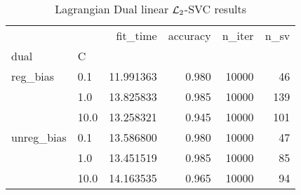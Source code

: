 \begin{table}[H]
\centering
\caption{Lagrangian Dual linear $\protect \mathcal{L}_2$-SVC results}
\label{linear_lagrangian_dual_l2_svc_cv_results}
\begin{tabular}{llrrrr}
\toprule
           &      &   fit\_time &  accuracy &  n\_iter &  n\_sv \\
dual & C &            &           &         &       \\
\midrule
reg\_bias & 0.1  &  11.991363 &     0.980 &   10000 &    46 \\
           & 1.0  &  13.825833 &     0.985 &   10000 &   139 \\
           & 10.0 &  13.258321 &     0.945 &   10000 &   101 \\
unreg\_bias & 0.1  &  13.586800 &     0.980 &   10000 &    47 \\
           & 1.0  &  13.451519 &     0.985 &   10000 &    85 \\
           & 10.0 &  14.163535 &     0.965 &   10000 &    94 \\
\bottomrule
\end{tabular}
\end{table}
